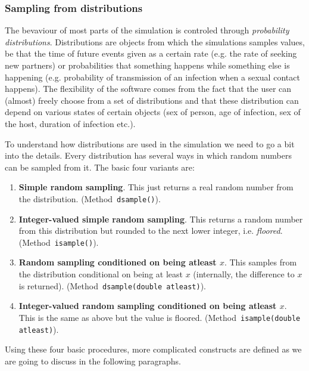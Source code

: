 \documentclass[11pt]{article}
\begin{document}

\subsubsection{Sampling from distributions}

The bevaviour of most parts of the simulation is controled through
\emph{probability distributions}. Distributions are objects from which the
simulations samples values, be that the time of future events given as a certain
rate (e.g. the rate of seeking new partners) or probabilities that something
happens while something else is happening (e.g. probability of transmission of
an infection when a sexual contact happens). The flexibility of the software
comes from the fact that the user can (almost) freely choose from a set of
distributions and that these distribution can depend on various states of
certain objects (sex of person, age of infection, sex of the host, duration of
infection etc.). 

To understand how distributions are used in the simulation we need to go a
bit into the details. Every distribution has several ways in which random
numbers can be sampled from it. The basic four variants are:
\begin{enumerate}
\item\textbf{Simple random sampling}. This just returns a real random number
from the distribution. (Method~\texttt{dsample()}). \item\textbf{Integer-valued
simple random sampling}. This returns a random number from this distribution but
rounded to the next lower integer, i.e. \emph{floored}.
(Method~\texttt{isample()}). \item\textbf{Random sampling conditioned on being
atleast ${x}$}. This samples from the distribution conditional on being
at least $x$ (internally, the difference to $x$ is returned).
(Method~\texttt{dsample(double atleast)}).
\item\textbf{Integer-valued random sampling conditioned on being atleast $x$}.
This is the same as above but the value is floored.
(Method~\texttt{isample(double atleast)}).
\end{enumerate}

Using these four basic procedures, more complicated constructs are defined as
we are going to discuss in the following paragraphs. 
\end{document}
